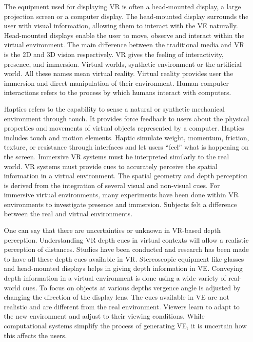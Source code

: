 The equipment used for displaying VR is often a head-mounted display, a large projection screen or a computer display. The head-mounted display surrounds the user with visual information, allowing them to interact with the VE naturally. Head-mounted displays enable the user to move, observe and interact within the virtual environment. The main difference between the traditional media and VR is the 2D and 3D vision respectively. VR gives the feeling of interactivity, presence, and immersion. 
Virtual worlds, synthetic environment or the artificial world. All these names mean virtual reality. Virtual reality provides user the immersion and direct manipulation of their environment\cite{lampton1995distance}.
Human-computer interactions refers to the process by which humans interact with computers. \par
Haptics refers to the capability to sense a natural or synthetic mechanical environment through touch. It provides force feedback to users about the physical properties and movements of virtual objects represented by a computer. Haptics includes touch and motion elements. Haptic simulate weight, momentum, friction, texture, or resistance through interfaces and let users “feel” what is happening on the screen.
Immersive VR systems must be interpreted similarly to the real world. VR systems must provide cues to accurately perceive the spatial information in a virtual environment.
The spatial geometry and depth perception is derived from the integration of several visual and non-visual cues. For immersive virtual environments, many experiments have been done within VR environments to investigate presence and immersion. Subjects felt a difference between the real and virtual environments.\cite{wegdistance}\cite{siegel1975development}\par
One can say that there are uncertainties or unknown in VR-based depth perception. Understanding VR depth cues in virtual contexts will allow a realistic perception of distances. Studies have been conducted and research has been made to have all these depth cues available in VR.   
Stereoscopic equipment like glasses and head-mounted displays helps in giving depth information in VE. 
Conveying depth information in a virtual environment is done using a wide variety of real-world cues. To focus on objects at various depths vergence angle is adjusted by changing the direction of the display lens. The cues available in VE are not realistic and are different from the real environment. Viewers learn to adapt to the new environment and adjust to their viewing conditions. While computational systems simplify the process of generating VE, it is uncertain how this affects the users.\cite{mandal2013brief}


